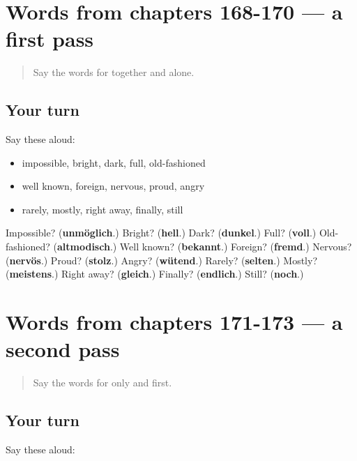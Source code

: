 \section[(dialogue)]{Words from chapters 168-170 — a first pass}

\label{lesson:GE-R173-first-pass-words-from-chapters-168-170}



\begin{quote}
Say the words for together and alone.
\end{quote}

\subsection*{Your turn}
Say these aloud:

\begin{itemize}
\raggedright
  \item impossible, bright, dark, full, old-fashioned
  \item well known, foreign, nervous, proud, angry
  \item rarely, mostly, right away, finally, still
\end{itemize}

\begin{tcolorbox}[breakable,colback=teal!4,colframe=teal!35!black,title={Before you move on}]
Impossible? (\textbf{unmöglich}.) Bright? (\textbf{hell}.) Dark? (\textbf{dunkel}.) Full? (\textbf{voll}.) Old-fashioned? (\textbf{altmodisch}.) Well known? (\textbf{bekannt}.) Foreign? (\textbf{fremd}.) Nervous? (\textbf{nervös}.) Proud? (\textbf{stolz}.) Angry? (\textbf{wütend}.) Rarely? (\textbf{selten}.) Mostly? (\textbf{meistens}.) Right away? (\textbf{gleich}.) Finally? (\textbf{endlich}.) Still? (\textbf{noch}.)
\end{tcolorbox}
\section[(dialogue)]{Words from chapters 171-173 — a second pass}

\label{lesson:GE-R173-second-pass-words-from-chapters-171-173}



\begin{quote}
Say the words for only and first.
\end{quote}

\subsection*{Your turn}
Say these aloud:

